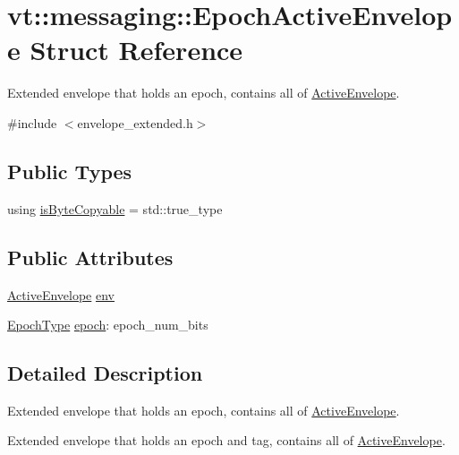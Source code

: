 \hypertarget{structvt_1_1messaging_1_1_epoch_active_envelope}{}\section{vt\+:\+:messaging\+:\+:Epoch\+Active\+Envelope Struct Reference}
\label{structvt_1_1messaging_1_1_epoch_active_envelope}


Extended envelope that holds an epoch, contains all of {\ttfamily \hyperlink{structvt_1_1messaging_1_1_active_envelope}{Active\+Envelope}}.  




{\ttfamily \#include $<$envelope\+\_\+extended.\+h$>$}

\subsection*{Public Types}
\begin{DoxyCompactItemize}
\item 
using \hyperlink{structvt_1_1messaging_1_1_epoch_active_envelope_acc191b9182733db346b508d4c77c2e58}{is\+Byte\+Copyable} = std\+::true\+\_\+type
\end{DoxyCompactItemize}
\subsection*{Public Attributes}
\begin{DoxyCompactItemize}
\item 
\hyperlink{structvt_1_1messaging_1_1_active_envelope}{Active\+Envelope} \hyperlink{structvt_1_1messaging_1_1_epoch_active_envelope_aba54092b517b6ade61d737d78aed8d3e}{env}
\item 
\hyperlink{namespacevt_a985a5adf291c34a3ca263b3378388236}{Epoch\+Type} \hyperlink{structvt_1_1messaging_1_1_epoch_active_envelope_ab2888fbf6456065ddf86656a1ed09329}{epoch}\+: epoch\+\_\+num\+\_\+bits
\end{DoxyCompactItemize}


\subsection{Detailed Description}
Extended envelope that holds an epoch, contains all of {\ttfamily \hyperlink{structvt_1_1messaging_1_1_active_envelope}{Active\+Envelope}}. 

Extended envelope that holds an epoch and tag, contains all of {\ttfamily \hyperlink{structvt_1_1messaging_1_1_active_envelope}{Active\+Envelope}}.

